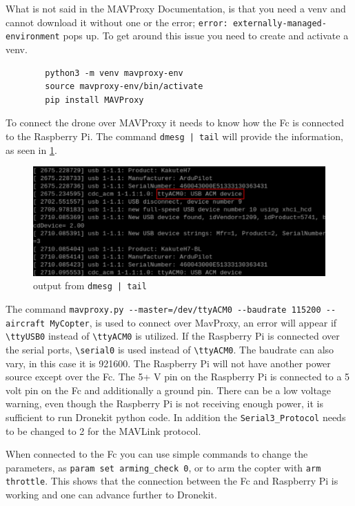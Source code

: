 \documentclass[svgnames]{article}
\begin{document}
	What is not said in the MAVProxy Documentation, is that you need a \gls{venv} and cannot download it without one or the error; \lstinline|error: externally-managed-environment| pops up. To get around this issue you need to create and activate a \gls{venv}.
	\begin{lstlisting}
		python3 -m venv mavproxy-env
		source mavproxy-env/bin/activate
		pip install MAVProxy
	\end{lstlisting} 
	
	
	To connect the drone over MAVProxy it needs to know how the \gls{Fc} is connected to the Raspberry Pi. The command \lstinline!dmesg | tail! will provide the information, as seen in \cref{fig:usbrasppiconectrectangle}.

\begin{figure}[th]
	\centering
	\includegraphics[width=0.7\linewidth]{pictures/USBRaspPiconect_rectangle}
	\caption{output from \lstinline!dmesg | tail!}
	\label{fig:usbrasppiconectrectangle}
\end{figure}

	
	The command \lstinline|mavproxy.py --master=/dev/ttyACM0 --baudrate 115200 --aircraft MyCopter|, is used to connect over MavProxy, an error will appear if \lstinline|\ttyUSB0| instead of \lstinline|\ttyACM0| is utilized. If the Raspberry Pi is connected over the serial ports, \lstinline|\serial0| is used instead of \lstinline|\ttyACM0|. The baudrate can also vary, in this case it is 921600. The Raspberry Pi will not have another power source except over the \gls{Fc}. The 5+ V pin on the Raspberry Pi is connected to a 5 volt pin on the \gls{Fc} and additionally a ground pin. There can be a low voltage warning, even though the Raspberry Pi is not receiving enough power, it is sufficient to run Dronekit python code. In addition the \lstinline|Serial3_Protocol| needs to be changed to 2 for the MAVLink protocol.
	
	When connected to the \gls{Fc} you can use simple commands to change the parameters, as \lstinline|param set arming_check 0|, or to arm the copter with \lstinline|arm throttle|. This shows that the connection between the \gls{Fc} and Raspberry Pi is working and one can advance further to Dronekit.
	
\end{document}
